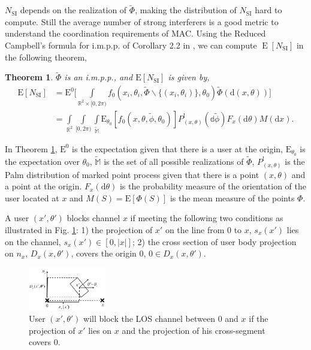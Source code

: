 \documentclass[10pt, conference, letterpaper]{IEEEtran}
\newtheorem{theorem}{Theorem}
\DeclareMathOperator*{\E}{\mathrm{E}}
\begin{document}
$N_{\mathrm{SI}}$ depends on the realization of $\tilde{\Phi}$, making the distribution of $N_{\mathrm{SI}}$ hard to compute. 
Still the average number of strong interferers is a good metric to understand the coordination requirements of MAC.
Using the Reduced Campbell's formula for i.m.p.p. of Corollary 2.2 in \cite{stochasticgeometry}, we can compute $\E[N_{\mathrm{SI}}]$ in the following theorem,
\begin{theorem}\label{theorem:E_N_SI}
	$\tilde{\Phi}$ is an i.m.p.p., and $\mathrm{E}[N_{\mathrm{SI}}]$ is given by,
	\begin{equation} \label{eq:N_SI}
	\begin{split}
	\mathrm{E}[N_{\mathrm{SI}}] &= \mathrm{E}^0\bigg[\int\limits_{\mathbb{R}^2\times[0,2\pi)}f_0(x_i, \theta_i, \tilde{\Phi}\backslash\{(x_i,\theta_i)\}, \theta_0)\tilde{\Phi}(\mathrm{d}(x,\theta)) \bigg]\\
	&= \int\limits_{\mathbb{R}^2}\int\limits_{[0,2\pi)}\int\limits_{\mathbb{\tilde{M}}}\mathrm{E}_{\theta_0}[f_0(x,\theta,\tilde{\phi}, \theta_0)]P_{(x,\theta)}^{!}(\mathbb{d}\tilde{\phi})F_x(\mathrm{d}\theta)M(\mathrm{d}x).
	\end{split}
	\end{equation}	
\end{theorem}
In Theorem \ref{theorem:E_N_SI}, $\mathrm{E}^0$ is the expectation given that there is a user at the origin, $\mathrm{E}_{\theta_0}$ is the expectation over $\theta_0$, $\mathbb{\tilde{M}}$ is the set of all possible realizations of $\tilde{\Phi}$, $P_{(x,\theta)}^!$ is the Palm distribution of marked point process given that there is a point $(x, \theta)$ and a point at the origin. $F_x(\mathrm{d}\theta)$ is the probability measure of the orientation of the user located at $x$ and $M(S)=\mathrm{E}[\Phi(S)]$ is the mean measure of the points $\Phi$.

A user $(x', \theta')$ blocks channel $x$ if meeting the following two conditions as illustrated in Fig. \ref{fig:Channel_enb}: 1) the projection of $x'$ on the line from $0$ to $x$, $s_x(x')$ lies on the channel, $s_x(x')\in [0,|x|]$; 2) the cross section of user body projection on $n_x$,  $D_x(x, \theta')$, covers the origin $0$, $0 \in D_x(x, \theta')$.

\begin{figure}
	\centering
	\includegraphics[width = 0.3\textwidth]{Channel_ENB.pdf}
	\caption{User $(x', \theta')$ will block the LOS channel between $0$ and $x$ if the projection of $x'$ lies on $x$ and the projection of his cross-segment covers $0$. }
	\label{fig:Channel_enb}
\end{figure}
\end{document}
